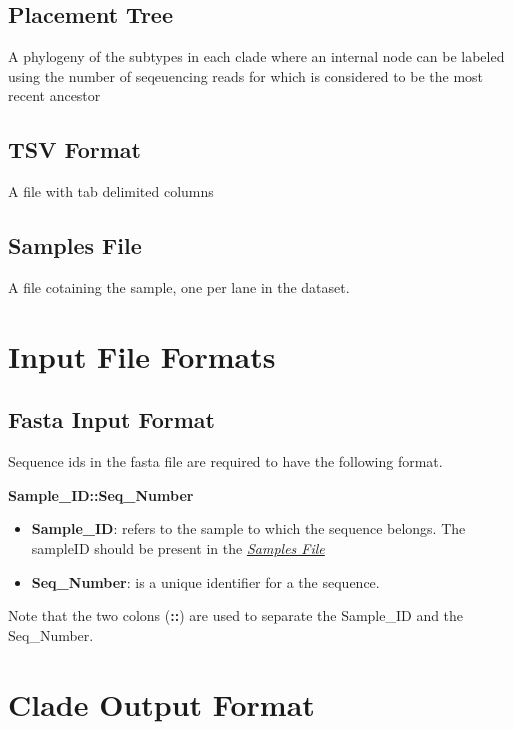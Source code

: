 \documentclass[letterpaper,10pt,english]{sphinxmanual}
\begin{document}
\subsection{Placement Tree}
\label{defs:placement-tree}
A phylogeny of the subtypes in each clade where an internal node can be labeled using the number of seqeuencing reads for which is considered to be the most recent ancestor


\subsection{TSV Format}
\label{defs:tsv}\label{defs:tsv-format}
A file with tab delimited columns


\subsection{Samples File}
\label{defs:samples-file}\label{defs:samplefile}
A file cotaining the sample, one per lane in the dataset.


\section{Input File Formats}
\label{defs:input-file-formats}

\subsection{Fasta Input Format}
\label{defs:fasta-input-format}\label{defs:inputformat}
Sequence ids in the fasta file are required to have the following format.

\textbf{Sample\_ID::Seq\_Number}
\begin{itemize}
\item {} 
\textbf{Sample\_ID}: refers to the sample to which the sequence belongs. The sampleID should be present in the {\hyperref[defs:samplefile]{\emph{Samples File}}}

\item {} 
\textbf{Seq\_Number}: is a unique identifier for a the sequence.

\end{itemize}

Note that the two colons (\textbf{::}) are used to separate the Sample\_ID and the Seq\_Number.


\section{Clade Output Format}
\label{defs:clade-output-format}
\end{document}
